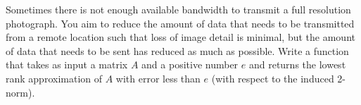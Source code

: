 \begin{problem}
Sometimes there is not enough available bandwidth to transmit a full resolution photograph.
You aim to reduce the amount of data that needs to be transmitted from a remote location such that loss of image detail is minimal, but the amount of data that needs to be sent has reduced as much as possible.
Write a function  that takes as input a matrix $A$ and a positive number $e$ and returns
the lowest rank approximation of $A$ with error less than $e$ (with respect to the induced 2-norm).
\end{problem}
